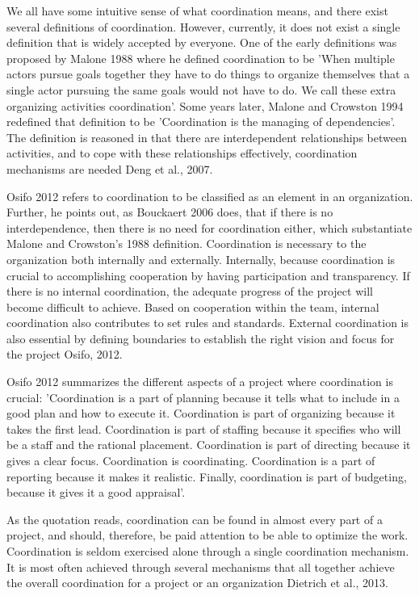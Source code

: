 We all have some intuitive sense of what coordination means, and there exist several definitions of coordination. However, currently, it does not exist a single definition that is widely accepted by everyone. One of the early definitions was proposed by Malone 1988 where he defined coordination to be ’When multiple actors pursue goals together they have to do things to organize themselves that a single actor pursuing the same goals would not have to do. We call these extra organizing activities coordination’. Some years later, Malone and Crowston 1994 redefined that definition to be ’Coordination is the managing of dependencies’. The definition is reasoned in that there are interdependent relationships between activities, and to cope with these relationships effectively, coordination mechanisms are needed Deng et al., 2007.

Osifo 2012 refers to coordination to be classified as an element in an organization. Further, he points out, as Bouckaert 2006 does, that if there is no interdependence, then there is no need for coordination either, which substantiate Malone and Crowston’s 1988 definition.
Coordination is necessary to the organization both internally and externally. Internally, because coordination is crucial to accomplishing cooperation by having participation and transparency. If there is no internal coordination, the adequate progress of the project will become difficult to achieve. Based on cooperation within the team, internal coordination also contributes to set rules and standards. External coordination is also essential by defining boundaries to establish the right vision and focus for the project Osifo, 2012.

Osifo 2012 summarizes the different aspects of a project where coordination is crucial:
’Coordination is a part of planning because it tells what to include in a good plan and how to execute it. Coordination is part of organizing because it takes the first lead. Coordination is part of staffing because it specifies who will be a staff and the rational placement. Coordination is part of directing because it gives a clear focus. Coordination is coordinating. Coordination is a part of reporting because it makes it realistic. Finally, coordination is part of budgeting, because it gives it a good appraisal’.

As the quotation reads, coordination can be found in almost every part of a project, and should, therefore, be paid attention to be able to optimize the work. Coordination is seldom exercised alone through a single coordination mechanism. It is most often achieved through several mechanisms that all together achieve the overall coordination for a project or an organization Dietrich et al., 2013.

